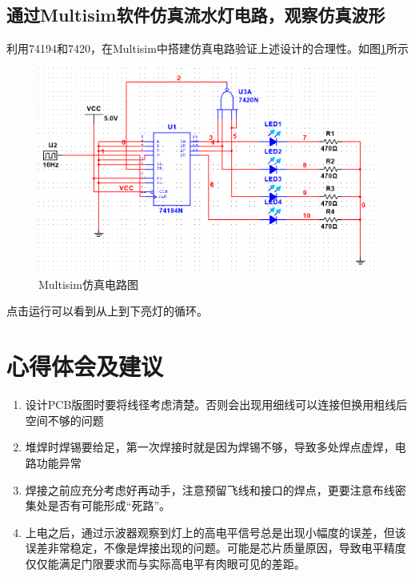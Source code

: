\documentclass{ctexart}
\begin{document}
\subsection{通过Multisim软件仿真流水灯电路，观察仿真波形}
利用74194和7420，在Multisim中搭建仿真电路验证上述设计的合理性。如图\ref{multisim}所示
\begin{figure}[H]
    \centering
    \includegraphics[scale=0.7]{pic/multisim.png}
    \caption{Multisim仿真电路图}
    \label{multisim}
\end{figure}
点击运行可以看到从上到下亮灯的循环。
\section{心得体会及建议}
\begin{enumerate}
    \item 设计PCB版图时要将线径考虑清楚。否则会出现用细线可以连接但换用粗线后空间不够的问题
    \item 堆焊时焊锡要给足，第一次焊接时就是因为焊锡不够，导致多处焊点虚焊，电路功能异常
    \item 焊接之前应充分考虑好再动手，注意预留飞线和接口的焊点，更要注意布线密集处是否有可能形成“死路”。
    \item 上电之后，通过示波器观察到灯上的高电平信号总是出现小幅度的误差，但该误差非常稳定，不像是焊接出现的问题。可能是芯片质量原因，导致电平精度仅仅能满足门限要求而与实际高电平有肉眼可见的差距。
\end{enumerate}
\end{document}

